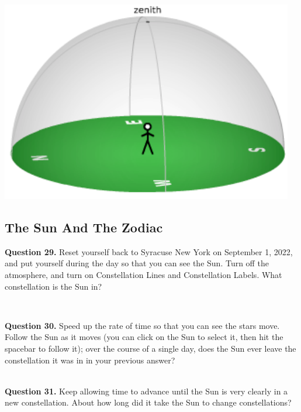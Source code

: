 \documentclass[11pt]{article}
\begin{document}
	\begin{center}
		\includegraphics{local_sky}
	\end{center}
	
	\subsection{The Sun And The Zodiac}
	
	\textbf{Question 29.} Reset yourself back to Syracuse New York on September 1, 2022, and put yourself during the day so that you can see the Sun. Turn off the atmosphere, and turn on Constellation Lines and Constellation Labels. What constellation is the Sun in? \\
	\vspace*{1.5cm}
	
	\hrulefill\\
	
	\newpage
	
	\textbf{Question 30.} Speed up the rate of time so that you can see the stars move. Follow the Sun as it moves (you can click on the Sun to select it, then hit the spacebar to follow it); over the course of a single day, does the Sun ever leave the constellation it was in in your previous answer? \\
	\vspace*{1.5cm}
	
	\hrulefill\\
	
	\textbf{Question 31.} Keep allowing time to advance until the Sun is very clearly in a new constellation. About how long did it take the Sun to change constellations? \\
	\vspace*{1.5cm}
	
\end{document}
